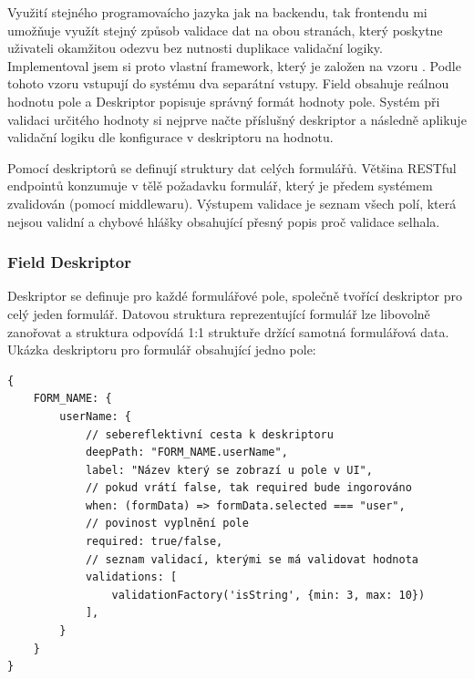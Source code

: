 Využití stejného programovaícho jazyka jak na backendu, tak frontendu mi umožňuje využít stejný způsob validace dat na obou stranách, který poskytne uživateli okamžitou odezvu bez nutnosti duplikace validační logiky. Implementoval jsem si proto vlastní framework, který je založen na vzoru  \cite{field-descriptor-pattern}. Podle tohoto vzoru vstupují do systému dva separátní vstupy. Field obsahuje reálnou hodnotu pole a Deskriptor popisuje správný formát hodnoty pole. Systém při validaci určitého hodnoty si nejprve načte příslušný deskriptor a následně aplikuje validační logiku dle konfigurace v deskriptoru na hodnotu.

Pomocí deskriptorů se definují struktury dat celých formulářů. Většina RESTful endpointů konzumuje v tělě požadavku formulář, který je předem systémem zvalidován (pomocí middlewaru). Výstupem validace je seznam všech polí, která nejsou validní a chybové hlášky obsahující přesný popis proč validace selhala.

\subsubsection{Field Deskriptor}
Deskriptor se definuje pro každé formulářové pole, společně tvořící deskriptor pro celý jeden formulář. Datovou struktura reprezentující formulář lze libovolně zanořovat a struktura odpovídá 1:1 struktuře držící samotná formulářová data. Ukázka deskriptoru pro formulář obsahující jedno pole:

\begin{verbatim}
{
    FORM_NAME: {
        userName: {
            // sebereflektivní cesta k deskriptoru
            deepPath: "FORM_NAME.userName",        
            label: "Název který se zobrazí u pole v UI",
            // pokud vrátí false, tak required bude ingorováno
            when: (formData) => formData.selected === "user", 
            // povinost vyplnění pole 
            required: true/false,
            // seznam validací, kterými se má validovat hodnota
            validations: [
                validationFactory('isString', {min: 3, max: 10})
            ],   
        }
    }
}
\end{verbatim}


